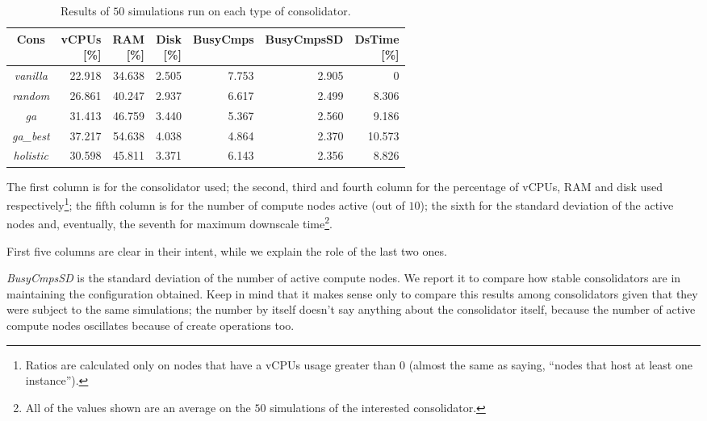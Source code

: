 \begin{table}[H]
\centering
  \begin{tabular}{| c | r | r | r | r | r | r |}
  \hline
  \textbf{Cons} & 
  \allownewline[t]{\textbf{vCPUs}\\[0pt]\textbf{[\%]}} & 
  \allownewline[t]{\textbf{RAM}\\[0pt]\textbf{[\%]}} & 
  \allownewline[t]{\textbf{Disk}\\[0pt]\textbf{[\%]}} & 
  \textbf{BusyCmps} & 
  \textbf{BusyCmpsSD} & 
  \allownewline[t]{\textbf{DsTime}\\[0pt]\textbf{[\%]}} \\
  \hline
  \emph{vanilla} & 22.918 & 34.638 & 2.505 & 7.753 & 2.905 & 0 \\
  \hline
  \emph{random} & 26.861 & 40.247 & 2.937 & 6.617 & 2.499 & 8.306 \\
  \hline
  \emph{ga} & 31.413 & 46.759 & 3.440 & 5.367 & 2.560 & 9.186 \\
  \hline
  \emph{ga\_best} & 37.217 & 54.638 & 4.038 & 4.864 & 2.370 & 10.573 \\
  \hline
  \emph{holistic} & 30.598 & 45.811 & 3.371 & 6.143 & 2.356 & 8.826 \\
  \hline
  \end{tabular}
  \vspace{2mm}
  \caption{Results of $50$ simulations run on each type of consolidator.}
  \label{tab:cons_vs}
\end{table}

The first column is for the consolidator used; the second, third and fourth column for the percentage of vCPUs, RAM and disk used respectively\footnote{Ratios are calculated only on nodes that have a vCPUs usage greater than $0$ (almost the same as saying, ``nodes that host at least one instance'').}; the fifth column is for the number of compute nodes active (out of $10$); the sixth for the standard deviation of the active nodes and, eventually, the seventh for maximum downscale time\footnote{All of the values shown are an average on the $50$ simulations of the interested consolidator.}.

First five columns are clear in their intent, while we explain the role of the last two ones.

\textit{BusyCmpsSD} is the standard deviation of the number of active compute nodes. We report it to compare how stable consolidators are in maintaining the configuration obtained. Keep in mind that it makes sense only to compare this results among consolidators given that they were subject to the same simulations; the number by itself doesn't say anything about the consolidator itself, because the number of active compute nodes oscillates because of create operations too.

